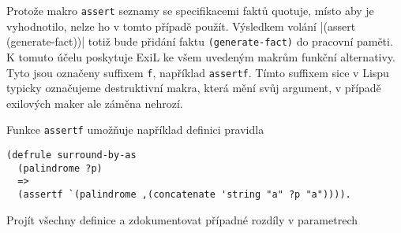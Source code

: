 Protože makro \verb|assert| seznamy se specifikacemi faktů quotuje, místo aby je
vyhodnotilo, nelze ho v tomto případě použít. Výsledkem volání
\cl|(assert (generate-fact))| totiž bude přidání faktu \verb|(generate-fact)| do
pracovní paměti. K tomuto účelu poskytuje ExiL ke všem uvedeným makrům funkční
alternativy. Tyto jsou označeny suffixem \verb|f|, například \verb|assertf|.
Tímto suffixem sice v Lispu typicky označujeme destruktivní makra, která mění
svůj argument, v případě exilových maker ale záměna nehrozí.

Funkce \verb|assertf| umožňuje například definici pravidla
\begin{verbatim}
(defrule surround-by-as
  (palindrome ?p)
  =>
  (assertf `(palindrome ,(concatenate 'string "a" ?p "a")))).
\end{verbatim}

\begin{framed}
Projít všechny definice a zdokumentovat případné rozdíly v parametrech
\end{framed}
